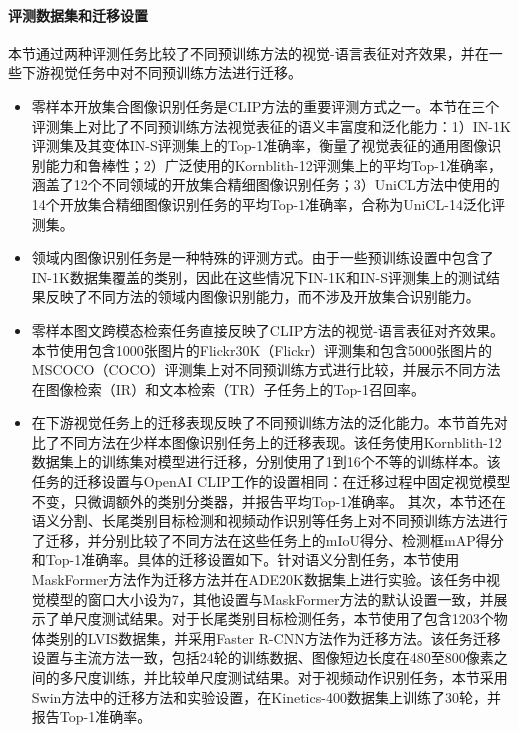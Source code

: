 \paragraph{评测数据集和迁移设置} 本节通过两种评测任务比较了不同预训练方法的视觉-语言表征对齐效果，并在一些下游视觉任务中对不同预训练方法进行迁移。
\begin{itemize}
    \item 零样本开放集合图像识别任务是CLIP方法的重要评测方式之一。本节在三个评测集上对比了不同预训练方法视觉表征的语义丰富度和泛化能力：1）IN-1K评测集及其变体IN-S评测集\cite{wang2019learningSketch}上的Top-1准确率，衡量了视觉表征的通用图像识别能力和鲁棒性；2）广泛使用的Kornblith-12评测集\cite{imagnettransfer}上的平均Top-1准确率，涵盖了12个不同领域的开放集合精细图像识别任务；3）UniCL\cite{unicl}方法中使用的14个开放集合精细图像识别任务的平均Top-1准确率，合称为UniCL-14泛化评测集。
    \item 领域内图像识别任务是一种特殊的评测方式。由于一些预训练设置中包含了IN-1K数据集覆盖的类别，因此在这些情况下IN-1K和IN-S评测集上的测试结果反映了不同方法的领域内图像识别能力，而不涉及开放集合识别能力。
    \item 零样本图文跨模态检索任务直接反映了CLIP方法的视觉-语言表征对齐效果。本节使用包含1000张图片的Flickr30K\cite{young2014flickr}（Flickr）评测集和包含5000张图片的MSCOCO\cite{chen2015microsoft}（COCO）评测集上对不同预训练方式进行比较，并展示不同方法在图像检索（IR）和文本检索（TR）子任务上的Top-1召回率。
    \item 在下游视觉任务上的迁移表现反映了不同预训练方法的泛化能力。本节首先对比了不同方法在少样本图像识别任务上的迁移表现。该任务使用Kornblith-12数据集上的训练集对模型进行迁移，分别使用了1到16个不等的训练样本。该任务的迁移设置与OpenAI CLIP工作\cite{radford2021learning}的设置相同：在迁移过程中固定视觉模型不变，只微调额外的类别分类器，并报告平均Top-1准确率。
    其次，本节还在语义分割、长尾类别目标检测和视频动作识别等任务上对不同预训练方法进行了迁移，并分别比较了不同方法在这些任务上的mIoU得分、检测框mAP得分和Top-1准确率。具体的迁移设置如下。针对语义分割任务，本节使用MaskFormer\cite{maskformer}方法作为迁移方法并在ADE20K数据集\cite{zhou2019ade}上进行实验。该任务中视觉模型的窗口大小设为7，其他设置与MaskFormer\cite{maskformer}方法的默认设置一致，并展示了单尺度测试结果。对于长尾类别目标检测任务，本节使用了包含1203个物体类别的LVIS数据集\cite{gupta2019lvis}，并采用Faster R-CNN\cite{ren2016faster}方法作为迁移方法。该任务迁移设置与主流方法\cite{Swin}一致，包括24轮的训练数据、图像短边长度在480至800像素之间的多尺度训练，并比较单尺度测试结果。对于视频动作识别任务，本节采用Swin方法\cite{Swin}中的迁移方法和实验设置，在Kinetics-400数据集\cite{kay2017kinetics}上训练了30轮，并报告Top-1准确率。
\end{itemize}

